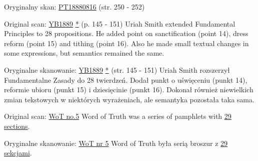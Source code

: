 Oryginalny skan: \href{https://adventistdigitallibrary.org/adl-402854/present-truth-august-16-1888?view_only=true&solr_nav%5Bid%5D=ff4d7f3f77b9bdf9e9ac&solr_nav%5Bpage%5D=0&solr_nav%5Boffset%5D=13}{PT18880816} (str. 250 - 252)






Original scan: \href{https://documents.adventistarchives.org/Yearbooks/YB1889.pdf#search=Yearbook%201889}{YB1889} \href{https://forgotten-pillar.s3.us-east-2.amazonaws.com/YB1889.pdf}{*} (p. 145 - 151) Uriah Smith extended Fundamental Principles to 28 propositions. He added point on sanctification (point 14), dress reform (point 15) and tithing (point 16). Also he made small textual changes in some expressions, but semantics remained the same.


Oryginalne skanowanie: \href{https://documents.adventistarchives.org/Yearbooks/YB1889.pdf#search=Yearbook%201889}{YB1889} \href{https://forgotten-pillar.s3.us-east-2.amazonaws.com/YB1889.pdf}{*} (str. 145 - 151) Uriah Smith rozszerzył Fundamentalne Zasady do 28 twierdzeń. Dodał punkt o uświęceniu (punkt 14), reformie ubioru (punkt 15) i dziesięcinie (punkt 16). Dokonał również niewielkich zmian tekstowych w niektórych wyrażeniach, ale semantyka pozostała taka sama.






Original scan: \href{https://adl.b2.adventistdigitallibrary.org/concern/published_works/4ffda25e-a06b-48d4-8ace-67cdcd33726f}{WoT no.5}
Word of Truth was a series of pamphlets with \href{https://adl.b2.adventistdigitallibrary.org/concern/parent/22267078_fundamental_principles_of_seventh_day_adventists/published_works/94a22141-33e8-4b9a-b397-2fe48c17bec4}{29 sections}.


Oryginalne skanowanie: \href{https://adl.b2.adventistdigitallibrary.org/concern/published_works/4ffda25e-a06b-48d4-8ace-67cdcd33726f}{WoT nr 5}
Word of Truth była serią broszur z \href{https://adl.b2.adventistdigitallibrary.org/concern/parent/22267078_fundamental_principles_of_seventh_day_adventists/published_works/94a22141-33e8-4b9a-b397-2fe48c17bec4}{29 sekcjami}.






